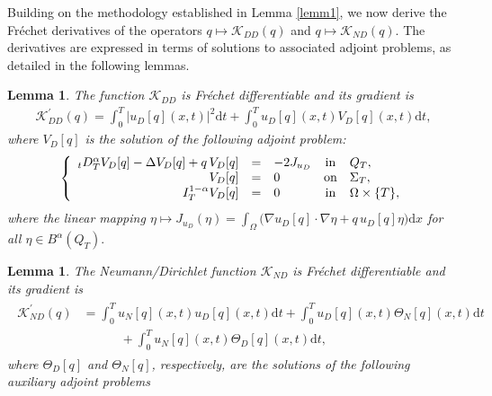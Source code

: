\documentclass[a4paper,12pt,reqno,natbib]{amsart}
\newtheorem{lemma}[theorem]{Lemma}
\newcommand{\dx} {\displaystyle\mathrm{d}x}
\newcommand{\dt} {\displaystyle\mathrm{d}t}
\begin{document}
{Building on the methodology established in Lemma \ref{lemm1}, we now derive the Fr\'echet derivatives of the operators $q\longmapsto\mathcal{K}_{DD}(q)$ and $q\longmapsto\mathcal{K}_{ND}(q)$. The derivatives are expressed in terms of solutions to associated adjoint problems, as detailed in the following lemmas.

\begin{lemma}\label{lemm2}
The function $\mathcal{K}_{DD}$ is Fr\'echet differentiable and its gradient is
\begin{align*}%
    \mathcal{K}_{DD}^{\prime}(q)= \int_{0}^T \Big| u_D[q](x,t)\Big|^2 \dt +\int_{0}^T   u_D[q](x,t) V_D[q](x,t)\dt,
\end{align*}
where $V_D[q]$ is the solution of the following adjoint problem:
\begin{eqnarray} \label{adjoint_D}
 \left\{
   \begin{array}{rclcl}
      {}_tD^{\alpha}_T V_D[q]-\Delta  V_D[q] +q\, V_D[q] &=&-2 J_{u_D} & \hbox{in} & Q_T, \\
 V_D[q]&=&0 &\hbox{on} & \Sigma_T,\\
 I^{1-\alpha}_{T}V_D[q]&=&0 &\hbox{in} & \Omega\times\{T\},
   \end{array}
 \right.
 \end{eqnarray}
where the linear mapping $\eta\longmapsto J_{u_D}(\eta)=\displaystyle\int_\Omega\Big(\nabla u_D[q]\cdot\nabla \eta+q\,u_D[q]\eta\Big)\dx$ for all $\eta\in B^\alpha(Q_T).$
\end{lemma}




\begin{lemma} \label{lemm3}
The Neumann/Dirichlet function $\mathcal{K}_{ND}$ is Fr\'echet differentiable and its gradient is
\begin{align} 
\begin{split}
\label{frechlet_ND}
    \mathcal{K}_{ND}^{\prime}(q)&= \int_{0}^T  u_N[q](x,t)u_D[q](x,t) \dt +\int_{0}^T   u_D[q](x,t) \Theta_N[q](x,t)\dt\\
    &\qquad\quad+\int_{0}^T   u_N[q](x,t) \Theta_D[q](x,t)\dt,
    \end{split}
\end{align}
where $\Theta_D[q]$ and $\Theta_N[q]$, respectively, are the solutions of the following auxiliary adjoint problems


\end{lemma}}
\end{document}
